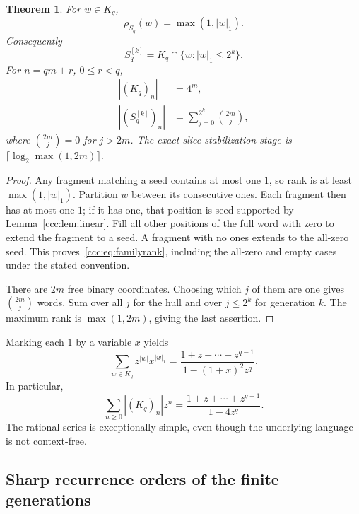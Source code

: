 \documentclass[11pt,letterpaper]{article}
\newtheorem{theorem}{Theorem}[section]
\theoremstyle{definition}
\theoremstyle{remark}
\newcommand{\gen}[2]{#1^{[#2]}}
\newcommand{\rank}{\rho}
\begin{document}
\begin{theorem}\label{ccc:thm:familyrank}
For $w\in K_q$,
\begin{equation}
 \rank_{S_q}(w)=\max(1,|w|_1).
 \label{ccc:eq:familyrank}
\end{equation}
Consequently
\begin{equation}
 \gen{S_q}k=K_q\cap\{w:|w|_1\leq2^k\}.
 \label{ccc:eq:familygeneration}
\end{equation}
For $n=qm+r$, $0\leq r<q$,
\begin{align}
 |(K_q)_n|&=4^m,\label{ccc:eq:familycount}\\
 |(\gen{S_q}k)_n|&=\sum_{j=0}^{2^k}\binom{2m}{j},\label{ccc:eq:levelcount}
\end{align}
where $\binom{2m}{j}=0$ for $j>2m$. The exact slice stabilization stage is
$\lceil\log_2\max(1,2m)\rceil$.
\end{theorem}
\begin{proof}
Any fragment matching a seed contains at most one $1$, so rank is at least
$\max(1,|w|_1)$. Partition $w$ between its consecutive ones. Each fragment
then has at most one $1$; if it has one, that position is seed-supported by
Lemma~\ref{ccc:lem:linear}. Fill all other positions of the full word with zero
to extend the fragment to a seed. A fragment with no ones extends to the
all-zero seed. This proves~\eqref{ccc:eq:familyrank}, including the all-zero and
empty cases under the stated convention.

There are $2m$ free binary coordinates. Choosing which $j$ of them are one
gives $\binom{2m}{j}$ words. Sum over all $j$ for the hull and over
$j\leq2^k$ for generation $k$. The maximum rank is $\max(1,2m)$, giving the
last assertion.
\end{proof}

Marking each $1$ by a variable $x$ yields
\begin{equation}
 \sum_{w\in K_q}z^{|w|}x^{|w|_1}
   =\frac{1+z+\cdots+z^{q-1}}{1-(1+x)^2z^q}.
 \label{ccc:eq:familyweighted}
\end{equation}
In particular,
\begin{equation}
 \sum_{n\geq0}|(K_q)_n|z^n
   =\frac{1+z+\cdots+z^{q-1}}{1-4z^q}.
 \label{ccc:eq:familygf}
\end{equation}
The rational series is exceptionally simple, even though the underlying
language is not context-free.

\subsection{Sharp recurrence orders of the finite generations}
\end{document}
